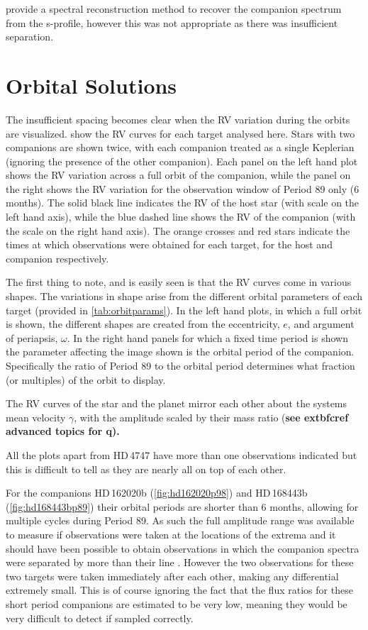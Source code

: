 \citet{ferluga_separating_1997} provide a spectral reconstruction method to recover the companion spectrum from the s-profile, however this was not appropriate as there was insufficient separation.


\section{Orbital Solutions}
\label{sec:orbtial_diagrams}
The insufficient spacing becomes clear when the RV variation during the orbits are visualized.
 show the RV curves for each target analysed here.
Stars with two companions are shown twice, with each companion treated as a single Keplerian (ignoring the presence of the other companion).
Each panel on the left hand plot shows the RV variation across a full orbit of the companion, while the panel on the right shows the RV variation for the observation window of Period 89 only (6 months).
The solid black line indicates the RV of the host star (with scale on the left hand axis), while the blue dashed line shows the RV of the companion (with the scale on the right hand axis).
The orange crosses and red stars indicate the times at which observations were obtained for each target, for the host and companion respectively.

The first thing to note, and is easily seen is that the RV curves come in various shapes.
The variations in shape arise from the different orbital parameters of each target (provided in \cref{tab:orbitparams}).
In the left hand plots, in which a full orbit is shown, the different shapes are created from the eccentricity, $e$, and argument of periapsis, $\omega$.
In the right hand panels for which a fixed time period is shown the parameter affecting the image shown is the orbital period of the companion.
Specifically the ratio of Period 89 to the orbital period determines what fraction (or multiples) of the orbit to display.

The RV curves of the star and the planet mirror each other about the systems mean velocity $\gamma$, with the amplitude scaled by their mass ratio (\textbf{see 	extbf{cref{}} advanced topics for q).}

All the plots apart from {HD\,4747} have more than one observations indicated but this is difficult to tell as they are nearly all on top of each other.

For the companions {HD\,162020}b (\cref{fig:hd162020p98}) and {HD\,168443}b (\cref{fig:hd168443bp89}) their orbital periods are shorter than 6 months, allowing for multiple cycles during Period 89.
As such the full amplitude range was available to measure if observations were taken at the locations of the extrema and it should have been possible to obtain observations in which the companion spectra were separated by more than their line \fwhm.
However the two observations for these two targets were taken immediately after each other, making any differential extremely small.
This is of course ignoring the fact that the flux ratios for these short period companions are estimated to be very low, meaning they would be very difficult to detect if sampled correctly.

